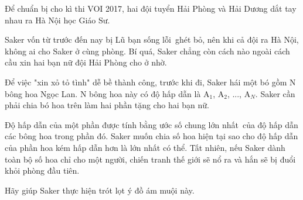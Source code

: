 Để chuẩn bị cho kì thi VOI 2017, hai đội tuyển Hải Phòng và Hải Dương dắt tay nhau ra Hà Nội học Giáo Sư.

Saker vốn từ trước đến nay bị Lũ bạn sống lỗi ghét bỏ, nên khi cả đội ra Hà Nội, không ai cho Saker ở cùng phòng. Bí quá, Saker chẳng còn cách nào ngoài cách cầu xin hai bạn nữ đội Hải Phòng cho ở nhờ.

Để việc "xin xỏ tỏ tình" dễ bề thành công, trước khi đi, Saker hái một bó gồm N bông hoa Ngọc Lan. N bông hoa này có độ hấp dẫn là A$_1$, A$_2$, ..., A$_N$. Saker cần phải chia bó hoa trên làm hai phần tặng cho hai bạn nữ.

Độ hấp dẫn của một phần được tính bằng ước số chung lớn nhất của độ hấp dẫn các bông hoa trong phần đó. Saker muốn chia số hoa hiện tại sao cho độ hấp dẫn của phần hoa kém hấp dẫn hơn là lớn nhất có thể. Tất nhiên, nếu Saker dành toàn bộ số hoa chỉ cho một người, chiến tranh thế giới sẽ nổ ra và hắn sẽ bị đuổi khỏi phòng đầu tiên.

Hãy giúp Saker thực hiện trót lọt ý đồ ám muội này.